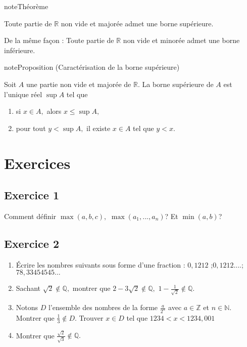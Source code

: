 \documentclass[letterpaper,10pt,french]{jupyterBook}
\begin{document}
\begin{sphinxadmonition}{note}{Théorème}

\sphinxAtStartPar
Toute partie de \(\mathbb{R}\) non vide et majorée admet une borne supérieure.
\end{sphinxadmonition}

\sphinxAtStartPar
De la même façon : Toute partie de \(\mathbb{R}\) non vide et minorée admet une borne inférieure.

\begin{sphinxadmonition}{note}{Proposition (Caractérisation de la borne supérieure)}

\sphinxAtStartPar
Soit \(A\) une partie non vide et majorée de \(\mathbb{R}.\) La borne supérieure de \(A\) est l’unique réel \(\sup A\) tel que
\begin{enumerate}
%
\item {} 
\sphinxAtStartPar
si \(x\in A,\) alors \(x \leqslant\sup A,\)

\item {} 
\sphinxAtStartPar
pour tout \(y < \sup A,\) il existe \(x\in A\) tel que \(y < x.\)

\end{enumerate}
\end{sphinxadmonition}


\section{Exercices}
\label{\detokenize{exo1:exercices}}\label{\detokenize{exo1::doc}}

\subsection{Exercice 1}
\label{\detokenize{exo1:exercice-1}}
\sphinxAtStartPar
Comment définir \(\max(a,b,c),\) \(\max(a_1,...,a_n)\)? Et \(\min(a,b)\)?


\subsection{Exercice 2}
\label{\detokenize{exo1:exercice-2}}\begin{enumerate}
%
\item {} 
\sphinxAtStartPar
Écrire les nombres suivants sous forme d’une fraction : \(0,1212\) ;\(0,1212 ....\); \(78,33454545...\)

\item {} 
\sphinxAtStartPar
Sachant \(\sqrt{2}\notin\mathbb{Q},\) montrer que \(2-3\sqrt{2}\notin\mathbb{Q},\) \(1-\frac{1}{\sqrt{2}}\notin\mathbb{Q}.\)

\item {} 
\sphinxAtStartPar
Notons \(D\) l’ensemble des nombres de la forme \(\frac{a}{2^{n}}\) avec \(a\in\mathbb{Z}\) et \(n\in \mathbb{N}\). Montrer que \(\frac{1}{3}\notin D\). Trouver \(x\in D\) tel que \(1234<x<1234,001\)

\item {} 
\sphinxAtStartPar
Montrer que \(\frac{\sqrt{2}}{\sqrt{3}}\notin \mathbb{Q}.\)

\end{enumerate}
\end{document}

